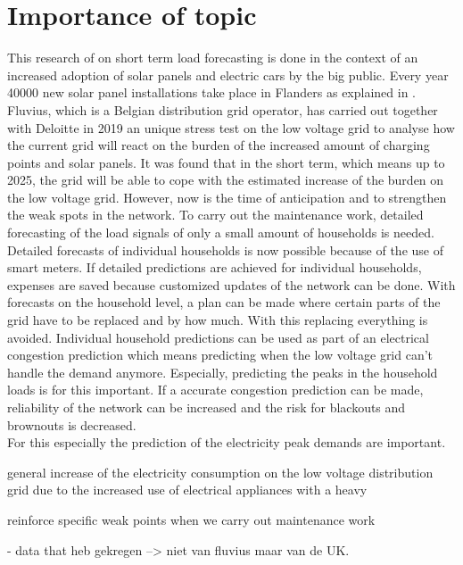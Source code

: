 \section{Importance of topic}
This research of on short term load forecasting is done in the context of an increased adoption of solar panels and electric cars by the big public. Every year 40000 new solar panel installations take place in Flanders as explained in \cite{Lemmens2019}. Fluvius, which is a Belgian distribution grid operator, has carried out together with Deloitte in 2019 an unique stress test on the low voltage grid to analyse how the current grid will react on the burden of the increased amount of charging points and solar panels. It was found that in the short term, which means up to 2025, the grid will be able to cope with the estimated increase of the burden on the low voltage grid. However, now is the time of anticipation and to strengthen the weak spots in the network. To carry out the maintenance work, detailed forecasting of the load signals of only a small amount of households is needed. Detailed forecasts of individual households is now possible because of the use of smart meters. If detailed predictions are achieved for individual households, expenses are saved because customized updates of the network can be done. With forecasts on the household level, a plan can be made where certain parts of the grid have to be replaced and by how much. With this replacing everything is avoided. Individual household predictions can be used as part of an electrical congestion prediction which means predicting when the low voltage grid can't handle the demand anymore. Especially, predicting the peaks in the household loads is for this important. If a accurate congestion prediction can be made, reliability of the network can be increased and the risk for blackouts and brownouts is decreased.\\




For this especially the prediction of the electricity peak demands are important. 



general increase of the electricity consumption on the low voltage distribution grid due to the increased use of electrical appliances with a heavy 

reinforce specific weak points when we carry out maintenance work



- data that heb gekregen --> niet van fluvius maar van de UK. 


